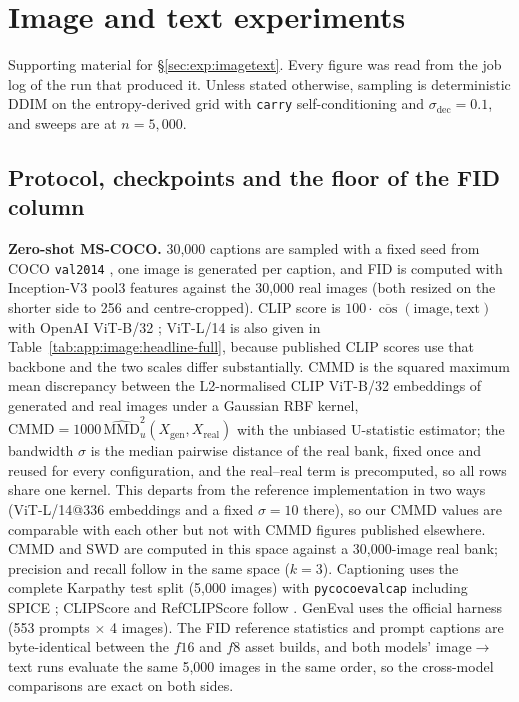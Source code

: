 \ifdefined\toyimageonly

\else

\section{Image and text experiments}
\label{app:image}

Supporting material for \S\ref{sec:exp:imagetext}. Every figure was read from the job log of the
run that produced it. Unless stated otherwise, sampling is deterministic DDIM on the
entropy-derived grid with \texttt{carry} self-conditioning and $\sigma_{\mathrm{dec}}{=}0.1$, and
sweeps are at $n{=}5{,}000$.

\subsection{Protocol, checkpoints and the floor of the FID column}
\label{app:image:protocol}

\textbf{Zero-shot MS-COCO.} 30{,}000 captions are sampled with a fixed seed from COCO
\texttt{val2014} \citep{image:mscoco}, one image is generated per caption, and FID
\citep{image:fid} is computed with Inception-V3 pool3 features against the 30{,}000 real images
(both resized on the shorter side to 256 and centre-cropped). CLIP score is
$100\cdot\overline{\cos}(\text{image},\text{text})$ with OpenAI ViT-B/32 \citep{image:clip};
ViT-L/14 is also given in Table~\ref{tab:app:image:headline-full}, because published CLIP scores
use that backbone and the two scales differ substantially. CMMD \citep{image:cmmd} is the squared maximum mean discrepancy between the
L2-normalised CLIP ViT-B/32 embeddings of generated and real images under a Gaussian RBF kernel,
$\mathrm{CMMD}=1000\,\widehat{\mathrm{MMD}}^2_u(X_{\mathrm{gen}},X_{\mathrm{real}})$ with the
unbiased U-statistic estimator; the bandwidth $\sigma$ is the median pairwise distance of the real
bank, fixed once and reused for every configuration, and the real--real term is precomputed, so all
rows share one kernel. This departs from the reference implementation in two ways (ViT-L/14@336
embeddings and a fixed $\sigma{=}10$ there), so our CMMD values are comparable with each other but
not with CMMD figures published elsewhere. CMMD and SWD are
computed in this space against a 30{,}000-image real bank; precision and recall follow
\citet{image:precision-recall} in the same space ($k{=}3$). Captioning uses the complete Karpathy
test split (5{,}000 images) with \texttt{pycocoevalcap} including SPICE \citep{image:spice};
CLIPScore and RefCLIPScore follow \citet{image:clipscore}. GenEval \citep{image:geneval} uses the
official harness (553 prompts $\times$ 4 images). The FID reference statistics and prompt captions
are byte-identical between the $f16$ and $f8$ asset builds, and both models' image$\rightarrow$text
runs evaluate the same 5{,}000 images in the same order, so the cross-model comparisons are exact
on both sides.

